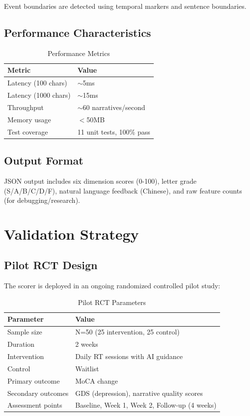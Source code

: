 \documentclass{article}
\begin{document}
Event boundaries are detected using temporal markers and sentence boundaries.

\subsection{Performance Characteristics}

\begin{table}[h]
\centering
\caption{Performance Metrics}
\label{tab:performance}
\begin{tabular}{ll}
\toprule
\textbf{Metric} & \textbf{Value} \\
\midrule
Latency (100 chars) & $\sim$5ms \\
Latency (1000 chars) & $\sim$15ms \\
Throughput & $\sim$60 narratives/second \\
Memory usage & $<$50MB \\
Test coverage & 11 unit tests, 100\% pass \\
\bottomrule
\end{tabular}
\end{table}

\subsection{Output Format}

JSON output includes six dimension scores (0-100), letter grade (S/A/B/C/D/F), natural language feedback (Chinese), and raw feature counts (for debugging/research).

\section{Validation Strategy}

\subsection{Pilot RCT Design}

The scorer is deployed in an ongoing randomized controlled pilot study:

\begin{table}[h]
\centering
\caption{Pilot RCT Parameters}
\label{tab:rct}
\begin{tabular}{ll}
\toprule
\textbf{Parameter} & \textbf{Value} \\
\midrule
Sample size & N=50 (25 intervention, 25 control) \\
Duration & 2 weeks \\
Intervention & Daily RT sessions with AI guidance \\
Control & Waitlist \\
Primary outcome & MoCA change \\
Secondary outcomes & GDS (depression), narrative quality scores \\
Assessment points & Baseline, Week 1, Week 2, Follow-up (4 weeks) \\
\bottomrule
\end{tabular}
\end{table}
\end{document}

